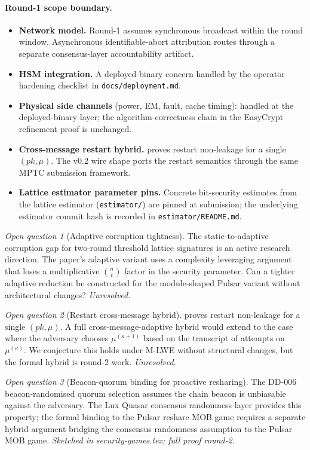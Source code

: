 \documentclass[11pt,a4paper]{article}
\theoremstyle{definition}
\theoremstyle{remark}
\newtheorem{openq}{Open question}
\begin{document}
\paragraph{Round-1 scope boundary.}

\begin{itemize}[leftmargin=*, itemsep=0pt]
\item \textbf{Network model.} Round-1 assumes synchronous broadcast
within the round window. Asynchronous identifiable-abort
attribution routes through a separate consensus-layer
accountability artifact.
\item \textbf{HSM integration.} A deployed-binary concern handled
by the operator hardening checklist in
\texttt{docs/deployment.md}.
\item \textbf{Physical side channels} (power, EM, fault, cache
timing): handled at the deployed-binary layer; the
algorithm-correctness chain in the EasyCrypt refinement proof is
unchanged.
\item \textbf{Cross-message restart hybrid.}
 proves restart non-leakage for a
single $(\mathit{pk}, \mu)$. The v0.2 wire shape ports the restart
semantics through the same MPTC submission framework.
\item \textbf{Lattice estimator parameter pins.} Concrete
bit-security estimates from the lattice estimator
(\texttt{estimator/}) are pinned at submission; the underlying
estimator commit hash is recorded in \texttt{estimator/README.md}.
\end{itemize}

\begin{openq}[Adaptive corruption tightness]
The static-to-adaptive corruption gap for two-round threshold
lattice signatures is an active research direction. The
\cite{boschini2024ringtail} paper's adaptive variant uses a complexity
leveraging argument that loses a multiplicative
$\binom{n}{t}$ factor in the security parameter. Can a tighter
adaptive reduction be constructed for the module-shaped
Pulsar variant without architectural changes? \emph{Unresolved.}
\end{openq}

\begin{openq}[Restart cross-message hybrid]
 proves restart non-leakage for a single
$(\mathit{pk}, \mu)$. A full cross-message-adaptive hybrid would
extend to the case where the adversary chooses $\mu^{(\kappa+1)}$
based on the transcript of attempts on $\mu^{(\kappa)}$. We
conjecture this holds under M-LWE without structural changes, but
the formal hybrid is round-2 work. \emph{Unresolved.}
\end{openq}

\begin{openq}[Beacon-quorum binding for proactive resharing]
The DD-006 beacon-randomised quorum selection assumes the chain
beacon is unbiasable against the adversary. The Lux Quasar
consensus randomness layer provides this property; the formal
binding to the Pulsar reshare MOB game requires a separate
hybrid argument bridging the consensus randomness assumption to
the Pulsar MOB game. \emph{Sketched in security-games.tex; full
proof round-2.}
\end{openq}



\end{document}
